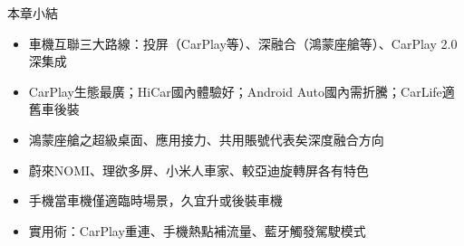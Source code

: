 \begin{tcbsummary}{本章小結}
\begin{itemize}
  \item 車機互聯三大路線：投屏（CarPlay等）、深融合（鴻蒙座艙等）、CarPlay 2.0深集成
  \item CarPlay生態最廣；HiCar國內體驗好；Android Auto國內需折騰；CarLife適舊車後裝
  \item 鴻蒙座艙之超級桌面、應用接力、共用賬號代表矣深度融合方向
  \item 蔚來NOMI、理欲多屏、小米人車家、較亞迪旋轉屏各有特色
  \item 手機當車機僅適臨時場景，久宜升或後裝車機
  \item 實用術：CarPlay重連、手機熱點補流量、藍牙觸發駕駛模式
\end{itemize}

\end{tcbsummary}
